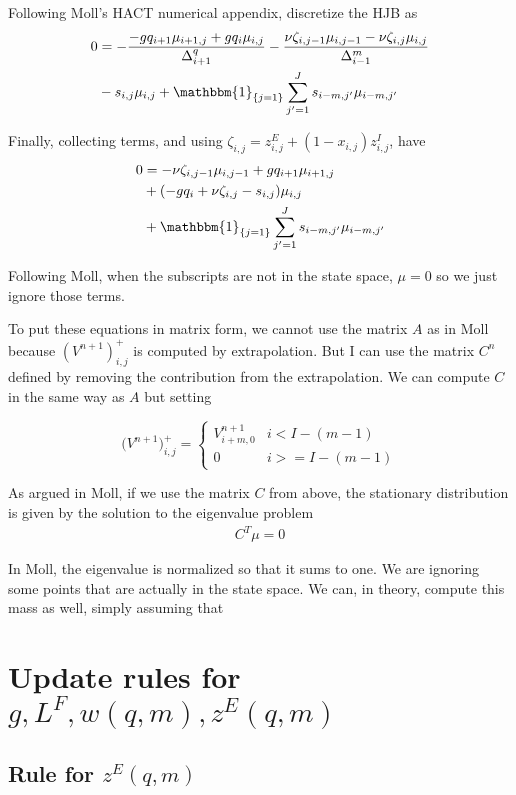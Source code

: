 \documentclass[12pt,english]{article}
\theoremstyle{remark}
\begin{document}
Following Moll's HACT numerical appendix, discretize the HJB as
\begin{align*}
0 &= -\frac{-gq_{i+1} \mu_{i+1,j} + gq_i \mu_{i,j} }{\Delta^q_{i+1}}  -\frac{\nu \zeta_{i,j-1} \mu_{i,j-1} - \nu \zeta_{i,j} \mu_{i,j}}{\Delta^m_{i-1}}\\
  &  - s_{i,j} \mu_{i,j} + \mathbbm{1}_{\{j = 1\}} \sum_{j'=1}^J s_{i-m,j'} \mu_{i-m,j'}
\end{align*}

Finally, collecting terms, and using $\zeta_{i,j} = z^E_{i,j} + (1-x_{i,j}) z^I_{i,j}$, have 
\begin{align*}
0 &= -\nu \zeta_{i,j-1} \mu_{i,j-1}  + gq_{i+1} \mu_{i+1,j} \\
& + (-gq_i + \nu  \zeta_{i,j} - s_{i,j}) \mu_{i,j} \\
& + \mathbbm{1}_{\{j=1\}} \sum_{j'=1}^J s_{i-m,j'} \mu_{i-m,j'}
\end{align*}

Following Moll, when the subscripts are not in the state space, $\mu = 0$ so we just ignore those terms.

To put these equations in matrix form, we cannot use the matrix $A$ as in Moll because $(V^{n+1})^+_{i,j}$ is computed by extrapolation. But I can use the matrix $C^n$ defined by removing the contribution from the extrapolation. We can compute $C$ in the same way as $A$ but setting 

\[ \big(V^{n+1}\big)^+_{i,j} = \begin{cases} 
V^{n+1}_{i+m,0} & i < I - (m-1) \\
0 & i >= I-(m-1) 
\end{cases}
\]

As argued in Moll, if we use the matrix $C$ from above, the stationary distribution is given by the solution to the eigenvalue problem 
\begin{align*}
C^T \mu = 0 
\end{align*}

In Moll, the eigenvalue is normalized so that it sums to one. We are ignoring some points that are actually in the state space. We can, in theory, compute this mass as well, simply assuming that 

\section{Update rules for $g,L^F,w(q,m),z^E(q,m)$}

\subsection{Rule for $z^E(q,m)$}
\end{document}
